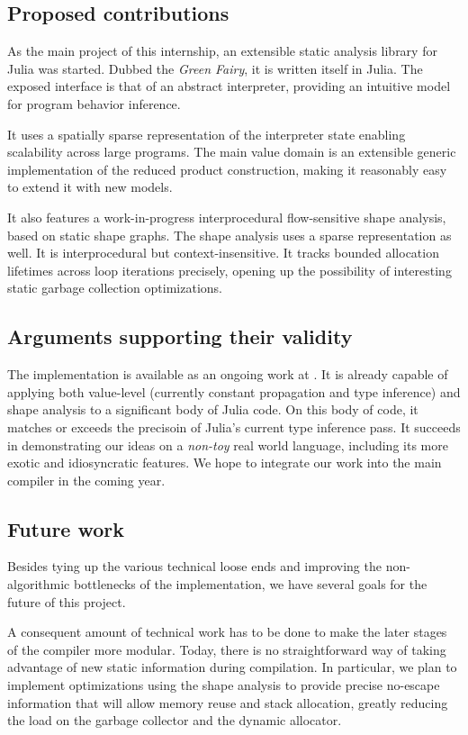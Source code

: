 \documentclass[11pt]{article}
\begin{document}
\subsection*{Proposed contributions}

As the main project of this internship, an extensible static analysis library for Julia was started. Dubbed the \emph{Green Fairy}, it is written itself in Julia. The exposed interface is that of an abstract interpreter, providing an intuitive model for program behavior inference.

It uses a spatially sparse representation of the interpreter state enabling scalability across large programs. The main value domain is an extensible generic implementation of the reduced product construction, making it reasonably easy to extend it with new models.

It also features a work-in-progress interprocedural flow-sensitive shape analysis, based on static shape graphs\cite{ssc}. The shape analysis uses a sparse representation as well. It is interprocedural but context-insensitive. It tracks bounded allocation lifetimes across loop iterations precisely, opening up the possibility of interesting static garbage collection optimizations.

\subsection*{Arguments supporting their validity}

The implementation is available as an ongoing work at \cite{gf-web}. It is already capable of applying both value-level (currently constant propagation and type inference) and shape analysis to a significant body of Julia code.
On this body of code, it matches or exceeds the precisoin of Julia's current type inference pass.
It succeeds in demonstrating our ideas on a \emph{non-toy} real world language, including its more exotic and idiosyncratic features.
We hope to integrate our work into the main compiler in the coming year.

\subsection*{Future work}

Besides tying up the various technical loose ends and improving the non-algorithmic bottlenecks of the implementation, we have several goals for the future of this project.

A consequent amount of technical work has to be done to make the later stages of the compiler more modular.
Today, there is no straightforward way of taking advantage of new static information during compilation.
In particular, we plan to implement optimizations using the shape analysis to provide precise no-escape information that will allow memory reuse and stack allocation, greatly reducing the load on the garbage collector and the dynamic allocator.
\end{document}
